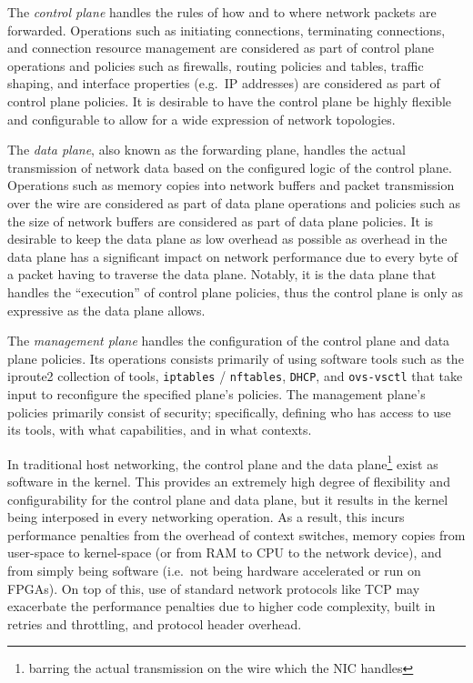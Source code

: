 \documentclass[12pt,titlepage]{article}
\begin{document}
The \textit{control plane} handles the rules of how and to where network packets are forwarded.
Operations such as initiating connections, terminating connections, and connection resource management are considered as part of control plane operations and policies such as firewalls, routing policies and tables, traffic shaping, and interface properties (e.g.\ IP addresses) are considered as part of control plane policies.
It is desirable to have the control plane be highly flexible and configurable to allow for a wide expression of network topologies.

The \textit{data plane}, also known as the forwarding plane, handles the actual transmission of network data based on the configured logic of the control plane.
Operations such as memory copies into network buffers and packet transmission over the wire are considered as part of data plane operations and policies such as the size of network buffers are considered as part of data plane policies.
It is desirable to keep the data plane as low overhead as possible as overhead in the data plane has a significant impact on network performance due to every byte of a packet having to traverse the data plane.
Notably, it is the data plane that handles the ``execution'' of control plane policies, thus the control plane is only as expressive as the data plane allows.

The \textit{management plane} handles the configuration of the control plane and data plane policies.
Its operations consists primarily of using software tools such as the iproute2 collection of tools, \texttt{iptables} / \texttt{nftables}, \texttt{DHCP}, and \texttt{ovs-vsctl} that take input to reconfigure the specified plane's policies.
The management plane's policies primarily consist of security; specifically, defining who has access to use its tools, with what capabilities, and in what contexts.

In traditional host networking, the control plane and the data plane\footnote{barring the actual transmission on the wire which the NIC handles} exist as software in the kernel.
This provides an extremely high degree of flexibility and configurability for the control plane and data plane, but it results in the kernel being interposed in every networking operation.
As a result, this incurs performance penalties from the overhead of context switches, memory copies from user-space to kernel-space (or from RAM to CPU to the network device), and from simply being software (i.e.\ not being hardware accelerated or run on FPGAs).
On top of this, use of standard network protocols like TCP may exacerbate the performance penalties due to higher code complexity, built in retries and throttling, and protocol header overhead.
\end{document}
